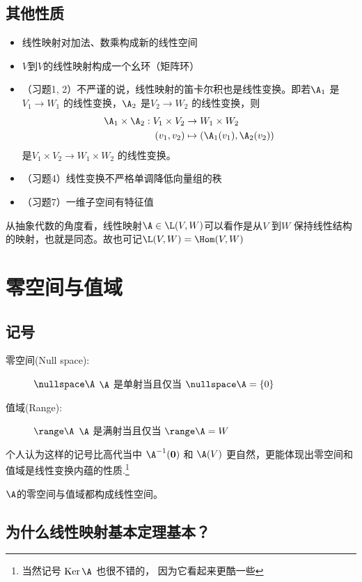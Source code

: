 \subsection{其他性质}
\begin{itemize}
    \item 线性映射对加法、数乘构成新的线性空间
    \item \(V\)到\(V\)的线性映射构成一个幺环（矩阵环）
    \item （习题1, 2）不严谨的说，线性映射的笛卡尔积也是线性变换。即若\(\A_{1}\)
        是\(V_{1} \to W_{1}\) 的线性变换，\(\A_{2}\)
        是\(V_{2} \to W_{2}\) 的线性变换，则
        \begin{align*}
            \A_{1} \times \A_{2} : V_{1}
            \times V_{2} &\to W_{1} \times W_{2}\\
            (v_{1},v_{2}) &\mapsto
            (\A_{1}(v_{1}),\A_{2}(v_{2}))
        \end{align*}
        是\(V_{1} \times V_{2} \to
        W_{1} \times W_{2}\) 的线性变换。
    \item （习题4）线性变换不严格单调降低向量组的秩
    \item （习题7）一维子空间有特征值
\end{itemize}

从抽象代数的角度看，线性映射\(\A \in \L(V,W)\)可以看作是从\(V\) 到\(W\)
保持线性结构的映射，也就是同态。故也可记\(\L(V,W)=\Hom(V,W)\)

\section{零空间与值域}
\subsection{记号}
\begin{description}
    \item[零空间(Null space):] \(\nullspace \A\)
        \(\A\) 是单射当且仅当
        \(\nullspace \A = \{0\}\)
    \item[值域(Range):] \(\range \A\)
        \(\A\) 是满射当且仅当
        \(\range \A = W\)
\end{description}
个人认为这样的记号比高代当中 \(\A^{-1}(\mathbf{0})\) 和 \(\A(V)\)
更自然，更能体现出零空间和值域是线性变换内蕴的性质.\footnote{当然记号
    \(\operatorname{Ker} \A\) 也很不错的，
因为它看起来更酷一些 }

\(\A\)的零空间与值域都构成线性空间。

\subsection{为什么线性映射基本定理基本？}

